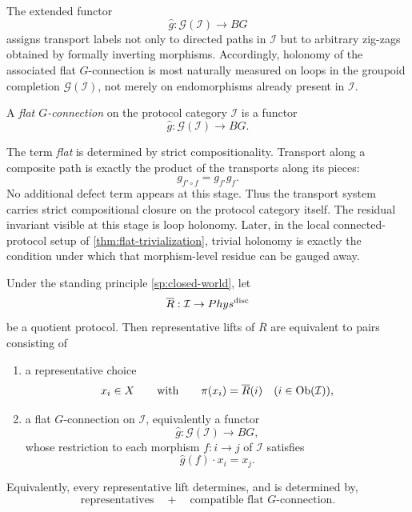 \begin{remark}
	The extended functor
	\[
		\widehat g:\mathcal G(\mathcal I)\to BG
	\]
	assigns transport labels not only to directed paths in \(\mathcal I\)
	but to arbitrary zig-zags obtained by formally inverting morphisms.
	Accordingly, holonomy of the associated flat \(G\)-connection is most
	naturally measured on loops in the groupoid completion
	\(\mathcal G(\mathcal I)\), not merely on endomorphisms already present
	in \(\mathcal I\).
\end{remark}
\begin{definition}
	\label{def:flat-connection}
	A \emph{flat \(G\)-connection} on the protocol category \(\mathcal I\)
	is a functor
	\[
		\widehat g:\mathcal G(\mathcal I)\to BG.
	\]
\end{definition}
\begin{remark}
	The term \emph{flat} is determined by strict compositionality.
	Transport along a composite path is exactly the product of the
	transports along its pieces:
	\[
		g_{f'\circ f}=g_{f'}g_f.
	\]
	No additional defect term appears at this stage.
	Thus the transport system carries strict compositional closure on the
	protocol category itself.
	The residual invariant visible at this stage is loop holonomy.
	Later, in the local connected-protocol setup of
	\cref{thm:flat-trivialization}, trivial holonomy is exactly the
	condition under which that morphism-level residue can be gauged away.
\end{remark}
\begin{theorem}
	\label{thm:flat-connection-interpretation}
	Under the standing principle \cref{sp:closed-world}, let
	\[
		\overline R:\mathcal I\to Phys^{\mathrm{disc}}
	\]
	be a quotient protocol.
	Then representative lifts of \(\overline R\) are equivalent to pairs
	consisting of
	\begin{enumerate}[label=\textup{(\roman*)}]
		\item a representative choice
		      \[
			      x_i\in X
			      \qquad
			      \text{with}
			      \qquad
			      \pi(x_i)=\overline R(i)
			      \quad
			      (i\in\operatorname{Ob}(\mathcal I)),
		      \]
		\item a flat \(G\)-connection on \(\mathcal I\), equivalently a functor
		      \[
			      \widehat g:\mathcal G(\mathcal I)\to BG,
		      \]
		      whose restriction to each morphism \(f:i\to j\) of
		      \(\mathcal I\) satisfies
		      \[
			      \widehat g(f)\cdot x_i=x_j.
		      \]
	\end{enumerate}
	Equivalently, every representative lift determines, and is determined
	by,
	\[
		\text{representatives}
		\quad+\quad
		\text{compatible flat }G\text{-connection}.
	\]
\end{theorem}
